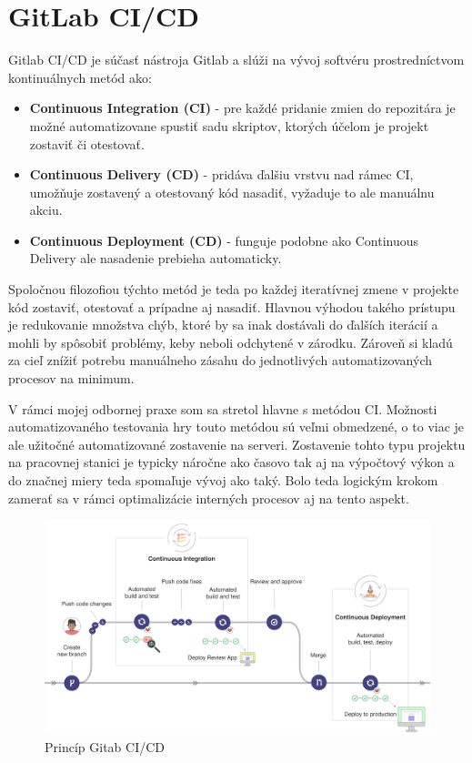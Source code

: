 \documentclass[slovak, bachelorpractice]{diploma}
\begin{document}
\section{GitLab CI/CD}
\label{sec:GitLab}
Gitlab CI/CD \cite{Cicd} je súčasť nástroja Gitlab a slúži na vývoj softvéru prostredníctvom kontinuálnych metód ako:
\begin{itemize}
  \item \textbf{Continuous Integration (CI)} - pre každé pridanie zmien do repozitára je možné automatizovane spustiť sadu skriptov, ktorých účelom je projekt zostaviť či otestovať.
  \item \textbf{Continuous Delivery (CD)} - pridáva ďalšiu vrstvu nad rámec CI, umožňuje zostavený a otestovaný kód nasadiť, vyžaduje to ale manuálnu akciu.
  \item \textbf{Continuous Deployment (CD)} - funguje podobne ako Continuous Delivery ale nasadenie prebieha automaticky.
\end{itemize}
Spoločnou filozofiou týchto metód je teda po každej iteratívnej zmene v projekte kód zostaviť, otestovať a prípadne aj nasadiť. Hlavnou výhodou takého prístupu je redukovanie množstva chýb, ktoré by sa inak dostávali do ďalších iterácií a mohli by spôsobiť problémy, keby neboli odchytené v zárodku. Zároveň si kladú za cieľ znížiť potrebu manuálneho zásahu do jednotlivých automatizovaných procesov na minimum.

V rámci mojej odbornej praxe som sa stretol hlavne s metódou CI. Možnosti automatizovaného testovania hry touto metódou sú veľmi obmedzené, o to viac je ale užitočné automatizované zostavenie na serveri. Zostavenie tohto typu projektu na pracovnej stanici je typicky náročne ako časovo tak aj na výpočtový výkon a do značnej miery teda spomaľuje vývoj ako taký. Bolo teda logickým krokom zamerať sa v rámci optimalizácie interných procesov aj na tento aspekt.

\begin{figure}[!htbp]
	\centering
	\includegraphics[width=1\textwidth]{Pictures/gitlab.png}
	\caption{Princíp Gitab CI/CD \cite{Cicd}}
	\label{pic:Gitlab}
\end{figure}
\end{document}
